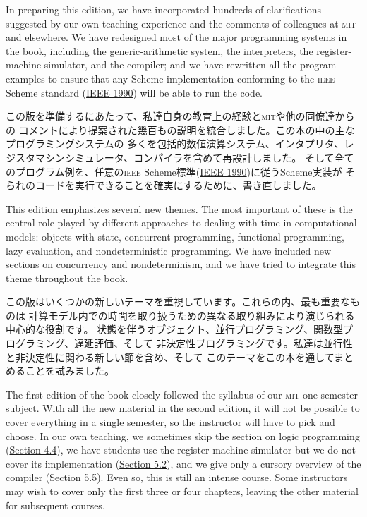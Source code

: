 \documentclass[oneside]{book}
\newcommand{\acronym}[1]{\textsc{\MakeLowercase{#1}}}
\newcommand{\link}[1]{\hyperref[#1]{#1}}
\begin{document}
In preparing this edition, we have incorporated hundreds of clarifications
suggested by our own teaching experience and the comments of colleagues at
\acronym{MIT} and elsewhere.  We have redesigned most of the major programming
systems in the book, including the generic-arithmetic system, the interpreters,
the register-machine simulator, and the compiler; and we have rewritten all the
program examples to ensure that any Scheme implementation conforming to the
\acronym{IEEE} Scheme standard (\link{IEEE 1990}) will be able to run the
code.

この版を準備するにあたって、私達自身の教育上の経験と\acronym{MIT}や他の同僚達からの
コメントにより提案された幾百もの説明を統合しました。この本の中の主なプログラミングシステムの
多くを包括的数値演算システム、インタプリタ、レジスタマシンシミュレータ、コンパイラを含めて再設計しました。
そして全てのプログラム例を、任意の\acronym{IEEE} Scheme標準(\link{IEEE 1990})に従うScheme実装が
そられのコードを実行できることを確実にするために、書き直しました。

This edition emphasizes several new themes.  The most important of these is the
central role played by different approaches to dealing with time in
computational models: objects with state, concurrent programming, functional
programming, lazy evaluation, and nondeterministic programming.  We have
included new sections on concurrency and nondeterminism, and we have tried to
integrate this theme throughout the book.

この版はいくつかの新しいテーマを重視しています。これらの内、最も重要なものは
計算モデル内での時間を取り扱うための異なる取り組みにより演じられる中心的な役割です。
状態を伴うオブジェクト、並行プログラミング、関数型プログラミング、遅延評価、そして
非決定性プログラミングです。私達は並行性と非決定性に関わる新しい節を含め、そして
このテーマをこの本を通してまとめることを試みました。

The first edition of the book closely followed the syllabus of our
\acronym{MIT} one-semester subject.  With all the new material in the second
edition, it will not be possible to cover everything in a single semester, so
the instructor will have to pick and choose.  In our own teaching, we sometimes
skip the section on logic programming (\link{Section 4.4}), we have students use
the register-machine simulator but we do not cover its implementation (\link{Section 5.2}), 
and we give only a cursory overview of the compiler (\link{Section 5.5}).  
Even so, this is still an intense course.  Some instructors may
wish to cover only the first three or four chapters, leaving the other material
for subsequent courses.
\end{document}
